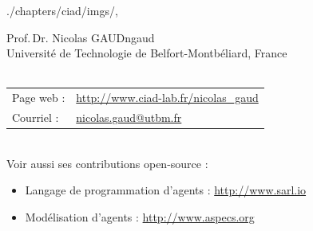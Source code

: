 \begin{graphicspathcontext}{{./chapters/ciad/imgs/},\old}

\begin{textpictureframe}{Prof\string.\,Dr\string. Nicolas GAUD}{ngaud}
	 \\[.25cm]
	
	{\scriptsize Université de Technologie de Belfort-Montbéliard, France} \\[.25cm]
	
	 \\[.25cm]

	\scriptsize \begin{tabularx}{\linewidth}{@{}lX@{}}
		Page web : & \url{http://www.ciad-lab.fr/nicolas_gaud} \\
		Courriel : & \href{mailto:nicolas.gaud@utbm.fr}{nicolas.gaud@utbm.fr} \\
	\end{tabularx} \\[.5cm]

	\scriptsize Voir aussi ses contributions open-source :\begin{itemize}
		\item Langage de programmation d'agents : \url{http://www.sarl.io}
		\item Modélisation d'agents : \url{http://www.aspecs.org}
	\end{itemize}
\end{textpictureframe}

\end{graphicspathcontext}

